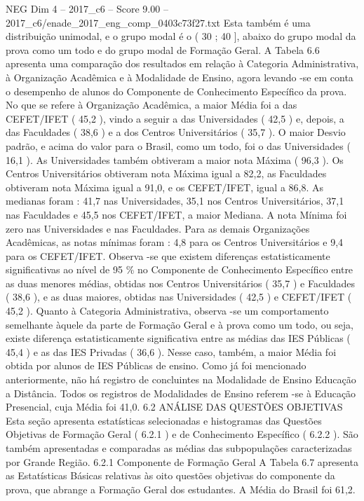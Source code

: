 \begin{textsample}{NEG Dim 4 – 2017\_c6 – Score 9.00 – 2017\_c6/enade\_2017\_eng\_comp\_0403c73f27.txt}
Esta também é uma distribuição unimodal, e o grupo modal é o ( 30 ; 40 ], abaixo do grupo modal da prova como um todo e do grupo modal de Formação Geral.
A Tabela 6.6 apresenta uma comparação dos resultados em relação à Categoria Administrativa, à Organização Acadêmica e à Modalidade de Ensino, agora levando -se em conta o desempenho de alunos do Componente de Conhecimento Específico da prova.
No que se refere à Organização Acadêmica, a maior Média foi a das CEFET/IFET ( 45,2 ), vindo a seguir a das Universidades ( 42,5 ) e, depois, a das Faculdades ( 38,6 ) e a dos Centros Universitários ( 35,7 ).
O maior Desvio padrão, e acima do valor para o Brasil, como um todo, foi o das Universidades ( 16,1 ).
As Universidades também obtiveram a maior nota Máxima ( 96,3 ).
Os Centros Universitários obtiveram nota Máxima igual a 82,2, as Faculdades obtiveram nota Máxima igual a 91,0, e os CEFET/IFET, igual a 86,8.
As medianas foram : 41,7 nas Universidades, 35,1 nos Centros Universitários, 37,1 nas Faculdades e 45,5 nos CEFET/IFET, a maior Mediana.
A nota Mínima foi zero nas Universidades e nas Faculdades.
Para as demais Organizações Acadêmicas, as notas mínimas foram : 4,8 para os Centros Universitários e 9,4 para os CEFET/IFET.
Observa -se que existem diferenças estatisticamente significativas ao nível de 95 \% no Componente de Conhecimento Específico entre as duas menores médias, obtidas nos Centros Universitários ( 35,7 ) e Faculdades ( 38,6 ), e as duas maiores, obtidas nas Universidades ( 42,5 ) e CEFET/IFET ( 45,2 ).
Quanto à Categoria Administrativa, observa -se um comportamento semelhante àquele da parte de Formação Geral e à prova como um todo, ou seja, existe diferença estatisticamente significativa entre as médias das IES Públicas ( 45,4 ) e as das IES Privadas ( 36,6 ).
Nesse caso, também, a maior Média foi obtida por alunos de IES Públicas de ensino.
Como já foi mencionado anteriormente, não há registro de concluintes na Modalidade de Ensino Educação a Distância.
Todos os registros de Modalidades de Ensino referem -se à Educação Presencial, cuja Média foi 41,0. 6.2 ANÁLISE DAS QUESTÕES OBJETIVAS Esta seção apresenta estatísticas selecionadas e histogramas das Questões Objetivas de Formação Geral ( 6.2.1 ) e de Conhecimento Específico ( 6.2.2 ).
São também apresentadas e comparadas as médias das subpopulações caracterizadas por Grande Região. 6.2.1 Componente de Formação Geral A Tabela 6.7 apresenta as Estatísticas Básicas relativas às oito questões objetivas do componente da prova, que abrange a Formação Geral dos estudantes.
A Média do Brasil foi 61,2.

\end{textsample}
